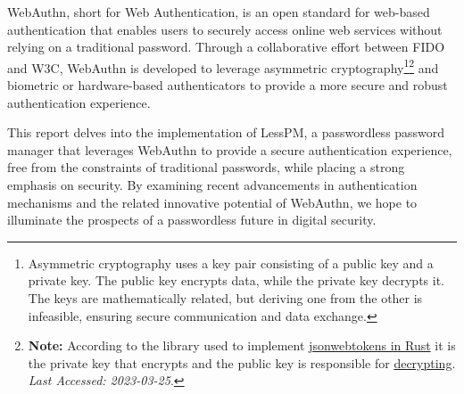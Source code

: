 WebAuthn, short for Web Authentication, is an open standard for web-based authentication that enables users to
securely access online web services without relying on a traditional password.
Through a collaborative effort between FIDO and W3C, WebAuthn is developed to leverage asymmetric cryptography\footnote{
    Asymmetric cryptography uses a key pair consisting of a public key and a private key. The public key encrypts
    data, while the private key decrypts it. The keys are mathematically related, but deriving one from the other 
    is infeasible, ensuring secure communication and data exchange.}\footnote{
    \textbf{Note:} According to the library used to implement
    \href{https://docs.rs/jsonwebtoken/latest/jsonwebtoken/index.html}{jsonwebtokens in Rust}
    it is the private key that encrypts and the public key is responsible for \href{https://docs.rs/jsonwebtoken/latest/jsonwebtoken/struct.DecodingKey.html#method.from_rsa_pem}
    {decrypting}. \textit{Last Accessed: 2023-03-25}.}
and biometric or hardware-based authenticators to provide a more secure and robust authentication experience.

This report delves into the implementation of LessPM, a passwordless password manager that leverages WebAuthn to provide a secure
authentication experience, free from the constraints of traditional passwords, while placing a strong emphasis on
security.
By examining recent advancements in authentication mechanisms and the related innovative potential of WebAuthn, we
hope to illuminate the prospects of a passwordless future in digital security.


